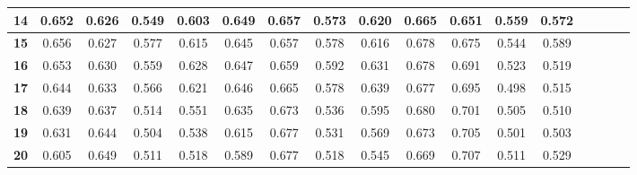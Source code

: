 \begin{table*}[!t]
\begin{tabular}{|c|c|c|c|c|c|c|c|c|c|c|c|c|c|c|c|c|}
\hline
\bfseries 14 & 0.652 & 0.626 & 0.549 & 0.603 & 0.649 & 0.657 & 0.573 & 0.620 & 0.665 & 0.651 & 0.559 & 0.572 \\
\hline
\bfseries 15 & 0.656 & 0.627 & 0.577 & 0.615 & 0.645 & 0.657 & 0.578 & 0.616 & 0.678 & 0.675 & 0.544 & 0.589 \\
\hline
\bfseries 16 & 0.653 & 0.630 & 0.559 & 0.628 & 0.647 & 0.659 & 0.592 & 0.631 & 0.678 & 0.691 & 0.523 & 0.519 \\
\hline
\bfseries 17 & 0.644 & 0.633 & 0.566 & 0.621 & 0.646 & 0.665 & 0.578 & 0.639 & 0.677 & 0.695 & 0.498 & 0.515 \\
\hline
\bfseries 18 & 0.639 & 0.637 & 0.514 & 0.551 & 0.635 & 0.673 & 0.536 & 0.595 & 0.680 & 0.701 & 0.505 & 0.510 \\
\hline
\bfseries 19 & 0.631 & 0.644 & 0.504 & 0.538 & 0.615 & 0.677 & 0.531 & 0.569 & 0.673 & 0.705 & 0.501 & 0.503 \\
\hline
\bfseries 20 & 0.605 & 0.649 & 0.511 & 0.518 & 0.589 & 0.677 & 0.518 & 0.545 & 0.669 & 0.707 & 0.511 & 0.529 \\
\hline
\end{tabular}
\end{table*}

